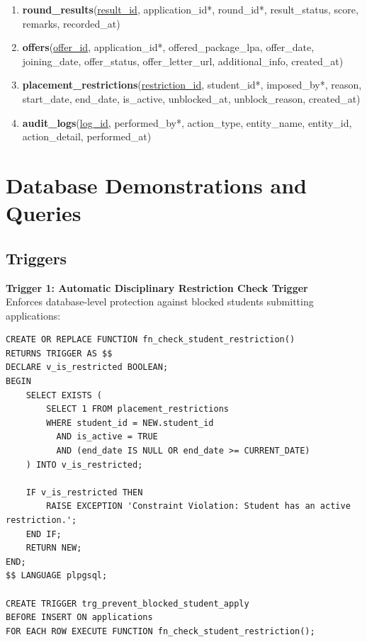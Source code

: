 \documentclass[12pt,a4paper]{report}
\begin{document}
\begin{enumerate}
    \item \textbf{round\_results}(\underline{result\_id}, application\_id*, round\_id*, result\_status, score, remarks, recorded\_at)
    \item \textbf{offers}(\underline{offer\_id}, application\_id*, offered\_package\_lpa, offer\_date, joining\_date, offer\_status, offer\_letter\_url, additional\_info, created\_at)
    \item \textbf{placement\_restrictions}(\underline{restriction\_id}, student\_id*, imposed\_by*, reason, start\_date, end\_date, is\_active, unblocked\_at, unblock\_reason, created\_at)
    \item \textbf{audit\_logs}(\underline{log\_id}, performed\_by*, action\_type, entity\_name, entity\_id, action\_detail, performed\_at)
\end{enumerate}

\chapter{Database Demonstrations and Queries}

\section{Triggers}
\textbf{Trigger 1: Automatic Disciplinary Restriction Check Trigger}\\
Enforces database-level protection against blocked students submitting applications:
\begin{lstlisting}
CREATE OR REPLACE FUNCTION fn_check_student_restriction()
RETURNS TRIGGER AS $$
DECLARE v_is_restricted BOOLEAN;
BEGIN
    SELECT EXISTS (
        SELECT 1 FROM placement_restrictions
        WHERE student_id = NEW.student_id
          AND is_active = TRUE
          AND (end_date IS NULL OR end_date >= CURRENT_DATE)
    ) INTO v_is_restricted;

    IF v_is_restricted THEN
        RAISE EXCEPTION 'Constraint Violation: Student has an active restriction.';
    END IF;
    RETURN NEW;
END;
$$ LANGUAGE plpgsql;

CREATE TRIGGER trg_prevent_blocked_student_apply
BEFORE INSERT ON applications
FOR EACH ROW EXECUTE FUNCTION fn_check_student_restriction();
\end{lstlisting}
\end{document}
